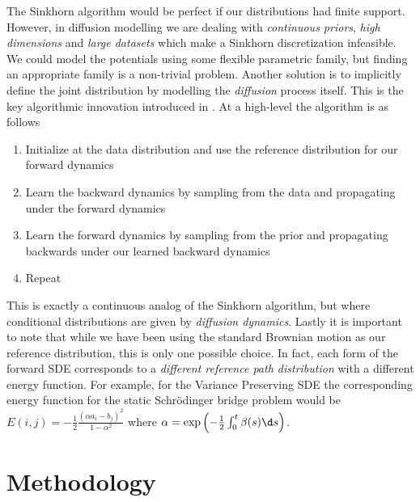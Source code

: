 \documentclass{article}
\begin{document}
The Sinkhorn algorithm would be perfect if our distributions had finite support.
However, in diffusion modelling we are dealing with \emph{continuous priors},
\emph{high dimensions} and \emph{large datasets} which make a Sinkhorn
discretization infeasible. We could model the potentials using some flexible
parametric family, but finding an appropriate family is a non-trivial problem.
Another solution is to implicitly define the joint distribution by modelling
the \emph{diffusion} process itself. This is the key algorithmic innovation
introduced
in \cite{debortoli2023diffusionschrodingerbridgeapplications}.
At a high-level the algorithm is as follows
\begin{enumerate}
    \item Initialize at the data distribution and use the reference distribution
    for our forward dynamics
    \item Learn the backward dynamics by sampling from the data and propagating
    under the forward dynamics
    \item Learn the forward dynamics by sampling from the prior and
    propagating backwards under our learned backward dynamics
    \item Repeat
\end{enumerate}
This is exactly a continuous analog of the Sinkhorn algorithm, but where
conditional distributions are given by \emph{diffusion dynamics}. Lastly it
is important to note that while we have been using the standard Brownian
motion as our reference distribution, this is only one possible choice. In fact,
each form of the forward SDE corresponds to a \emph{different reference
path distribution} with a different energy function. For example, for the
Variance Preserving SDE \cite{song2021scorebasedgenerativemodelingstochastic}
the corresponding energy function for the static Schrödinger bridge problem
would be $E(i, j) = -\frac 1 2 \frac{(\alpha a_i - b_j)^2}{1-\alpha^2}$ where
$\alpha = \exp\left(-\frac 1 2 \int_0^t \beta(s) \d s\right)$. 

\section{Methodology}
\end{document}
